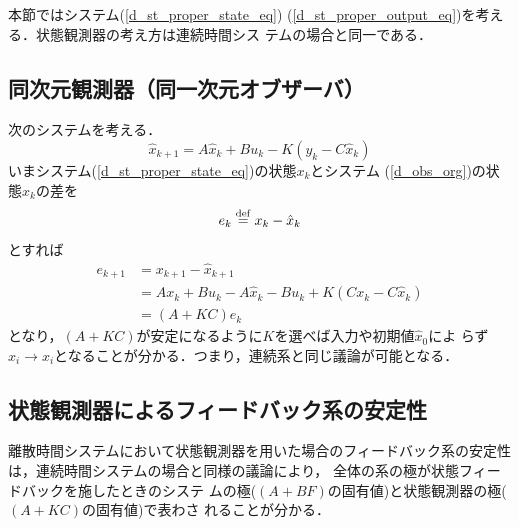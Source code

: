 本節ではシステム(\ref{d_st_proper_state_eq})
(\ref{d_st_proper_output_eq})を考える．状態観測器の考え方は連続時間シス
テムの場合と同一である．
\subsection{同次元観測器（同一次元オブザーバ）}
次のシステムを考える．
\begin{equation}
 \hat{x}_{k+1} = A \hat{x}_k + B u_k - K (y_k - C \hat{x}_k)
  \label{d_obs_org}
\end{equation}
いまシステム(\ref{d_st_proper_state_eq})の状態$x_k$とシステム
(\ref{d_obs_org})の状態$\hat{x}_k$の差を
\begin{equation}
 e_k \stackrel{\rm def}{=} x_k - \hat{x}_k
\end{equation}
とすれば
\begin{align}
 e_{k+1} &= x_{k+1} - \hat{x}_{k+1} \nonumber \\
         &= A x_k + B u_k 
	  - A \hat{x}_k - B u_k + K ( C x_k - C \hat{x}_k) \nonumber \\
         &= (A + KC) e_k
\end{align}
となり，$(A + KC)$が安定になるように$K$を選べば入力や初期値$\hat{x}_0$によ
らず$\hat{x}_i \rightarrow x_i$となることが分かる．つまり，連続系と同じ議論が可能となる．
\subsection{状態観測器によるフィードバック系の安定性}
離散時間システムにおいて状態観測器を用いた場合のフィードバック系の安定性
は，連続時間システムの場合と同様の議論により，
全体の系の極が状態フィードバックを施したときのシステ
ムの極($(A+BF)$の固有値)と状態観測器の極($(A + KC)$の固有値)で表わさ
れることが分かる．
